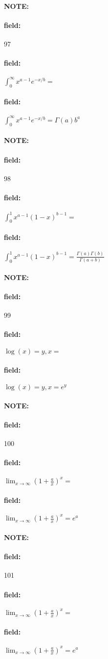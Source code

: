 \documentclass[12pt]{article}
\newenvironment{note}{\paragraph{NOTE:}}{}
\newenvironment{field}{\paragraph{field:}}{}
\begin{document}
\begin{note} \begin{field} \tiny 97 \end{field}
  \begin{field}
    $\int_0^\infty x^{a-1}e^{-x/b} = $
  \end{field}
  \begin{field}
    $\int_0^\infty x^{a-1}e^{-x/b} = \Gamma(a)b^a$
  \end{field}
\end{note}

\begin{note} \begin{field} \tiny 98 \end{field}
  \begin{field}
    $\int_0^1 x^{a - 1}(1 - x)^{b-1} = $
  \end{field}
  \begin{field}
    $\int_0^1 x^{a - 1}(1 - x)^{b-1} = \frac{\Gamma(a)\Gamma(b)}{\Gamma(a + b)}$
  \end{field}
\end{note}

\begin{note} \begin{field} \tiny 99 \end{field}
  \begin{field}
    $\log(x) = y , x = $
  \end{field}
  \begin{field}
    $\log(x) = y , x = e^y$
  \end{field}
\end{note}

\begin{note} \begin{field} \tiny 100 \end{field}
  \begin{field}
    $\lim_{x \to \infty}( 1 + \frac{a}{x})^x = $
  \end{field}
    \begin{field}
      $\lim_{x \to \infty}( 1 + \frac{a}{x})^x = e^a$
    \end{field}
\end{note}

\begin{note} \begin{field} \tiny 101 \end{field}
  \begin{field}
    $\lim_{x \to \infty}( 1 + \frac{a}{x})^x = $
  \end{field}
  \begin{field}
    $\lim_{x \to \infty}( 1 + \frac{a}{x})^x = e^a$
  \end{field}
\end{note}
\end{document}
